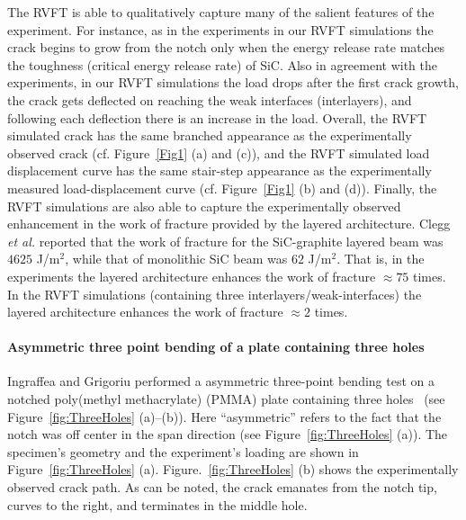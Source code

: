 \documentclass[11pt,letterpaper]{report}
\begin{document}
\begin{enumerate}[label=\textit{2.\arabic*},wide, labelwidth=!, labelindent=0pt]
The RVFT is able to qualitatively capture  many of the salient features of the experiment. For instance,  as in the experiments  in our RVFT simulations the crack begins to grow from the notch only  when the energy release rate matches the toughness (critical energy release rate) of SiC. Also in agreement with the experiments, in our RVFT simulations the load drops after the first crack growth, the  crack gets deflected on reaching the weak interfaces (interlayers), and following each deflection there is an increase in the load. Overall, the RVFT simulated crack has the same branched appearance as the experimentally observed crack (cf. Figure~\ref{Fig1} (a) and (c)), and the  RVFT simulated load displacement curve has the same stair-step appearance as the experimentally measured load-displacement curve (cf. Figure~\ref{Fig1} (b) and (d)). Finally, the RVFT simulations are also able to capture the experimentally observed enhancement in the work of fracture provided by the layered architecture.  Clegg \textit{et al.} reported that the work of fracture for the  SiC-graphite layered beam was $4625$ J/m$^2$, while that of monolithic SiC beam was $62$ J/m$^2$. That is, in the experiments the layered architecture enhances the work of fracture $\approx 75$ times. In the RVFT simulations (containing three interlayers/weak-interfaces) the  layered architecture enhances the work of fracture $\approx 2$ times. 
  






\paragraph{Asymmetric three point bending of a plate containing three holes}


	Ingraffea and Grigoriu performed a asymmetric three-point bending test on a notched poly(methyl methacrylate) (PMMA) plate containing three holes~\cite{ingraffea1990probabilistic} (see Figure~\ref{fig:ThreeHoles} (a)--(b)). %
	Here ``asymmetric'' refers to the fact that the notch was off center in the span direction (see Figure~\ref{fig:ThreeHoles} (a)). %
	The specimen's geometry and the experiment's loading are shown in Figure~\ref{fig:ThreeHoles} (a). %
	Figure.~\ref{fig:ThreeHoles} (b) shows the experimentally observed crack path. %
	As can be noted, the crack emanates from the notch tip, curves to the right, and terminates in the middle hole.   


\end{enumerate}
\end{document}
